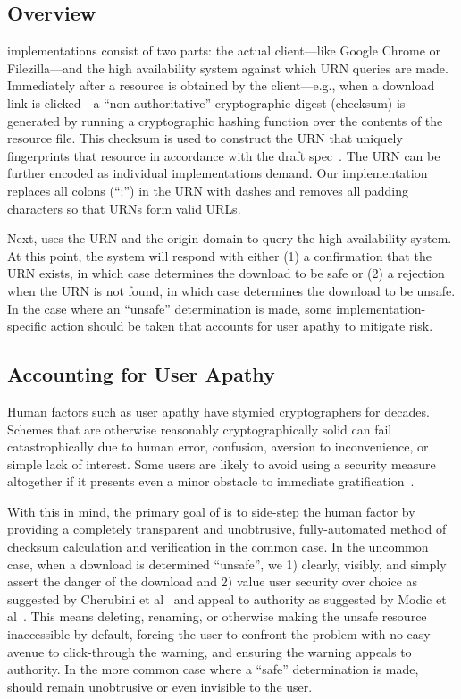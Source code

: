 \subsection{Overview}

\SYSTEM{} implementations consist of two parts: the actual client---like Google
Chrome or Filezilla---and the high availability system against which URN queries
are made. Immediately after a resource is obtained by the client---e.g., when a
download link is clicked---a ``non-authoritative'' cryptographic digest
(checksum) is generated by running a cryptographic hashing function over the
contents of the resource file. This checksum is used to construct the URN that
uniquely fingerprints that resource in accordance with the draft
spec~\cite{draft-URN}. The URN can be further encoded as individual
implementations demand. Our implementation replaces all colons (``:'') in the
URN with dashes and removes all padding characters so that URNs form valid URLs.

Next, \SYSTEM{} uses the URN and the origin domain to query the high
availability system. At this point, the system will respond with either (1) a
confirmation that the URN exists, in which case \SYSTEM{} determines the
download to be safe or (2) a rejection when the URN is not found, in which case
\SYSTEM{} determines the download to be unsafe. In the case where an ``unsafe''
determination is made, some implementation-specific action should be taken that
accounts for user apathy to mitigate risk.

\subsection{Accounting for User Apathy}

Human factors such as user apathy have stymied cryptographers for decades.
Schemes that are otherwise reasonably cryptographically solid can fail
catastrophically due to human error, confusion, aversion to inconvenience, or
simple lack of interest. Some users are likely to avoid using a security measure
altogether if it presents even a minor obstacle to immediate
gratification~\cite{PGPBad, Egelman1, Egelman2, Modic, Reeder, Silic, Bianchi,
Akhawe, Cherubini}.


With this in mind, the primary goal of \SYSTEM{} is to side-step the human
factor by providing a completely transparent and unobtrusive, fully-automated
method of checksum calculation and verification in the common case. In the
uncommon case, when a download is determined ``unsafe'', we 1) clearly, visibly,
and simply assert the danger of the download and 2) value user security over
choice as suggested by Cherubini et al~\cite{Cherubini} and appeal to authority
as suggested by Modic et al~\cite{Modic}. This means deleting, renaming, or
otherwise making the unsafe resource inaccessible by default, forcing the user
to confront the problem with no easy avenue to click-through the warning, and
ensuring the warning appeals to authority. In the more common case where a
``safe'' determination is made, \SYSTEM{} should remain unobtrusive or even
invisible to the user.


